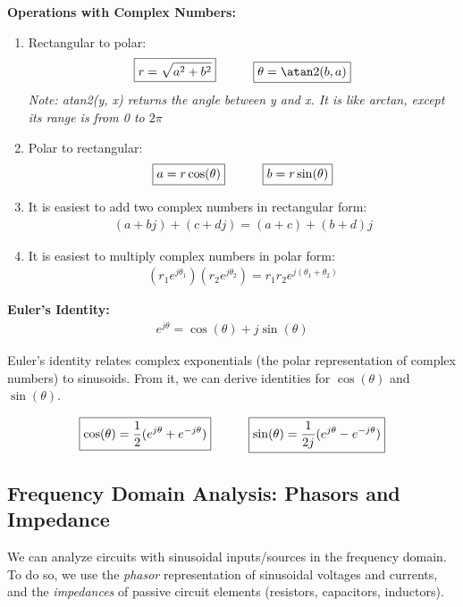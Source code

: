 \textbf{Operations with Complex Numbers:}
\begin{enumerate}
    \item Rectangular to polar:
    \begin{align*}
        \boxed{r = \sqrt{a^2 + b^2}} \hspace{30px} \boxed{\theta = \atan2(b, a)}
    \end{align*}
    \textit{Note: atan2(y, x) returns the angle between y and x. It is like arctan, except its range is from 0 to $2\pi$}
    \item Polar to rectangular:
    \begin{align*}
        \boxed{a = r \cos(\theta)} \hspace{30px} \boxed{b = r \sin(\theta)}
    \end{align*}

    \item It is easiest to add two complex numbers in rectangular form:
    \begin{align*}
        (a + bj) + (c + dj) = (a + c) + (b + d)j
    \end{align*}

    \item It is easiest to multiply complex numbers in polar form:
    \begin{align*}
        (r_1 e^{j \theta_1})(r_2 e^{j \theta_2}) = r_1 r_2 e^{j (\theta_1 + \theta_2)}
    \end{align*}
\end{enumerate}

\textbf{Euler's Identity:}
\begin{align*}
    \boxed{e^{j \theta} = \cos(\theta) + j \sin(\theta)}
\end{align*}

Euler's identity relates complex exponentials (the polar representation of complex numbers) to sinusoids. From it, we can derive identities for $\cos(\theta)$ and $\sin(\theta)$.

\begin{align*}
    \boxed{\cos(\theta) = \frac{1}{2} (e^{j \theta} + e^{-j \theta})} \hspace{30px}
    \boxed{\sin(\theta) = \frac{1}{2j} (e^{j \theta} - e^{-j \theta})}
\end{align*}

\subsection*{Frequency Domain Analysis: Phasors and Impedance}
We can analyze circuits with sinusoidal inputs/sources in the frequency domain. To do so, we use the \textit{phasor} representation of sinusoidal voltages and currents, and the \textit{impedances} of passive circuit elements (resistors, capacitors, inductors).


